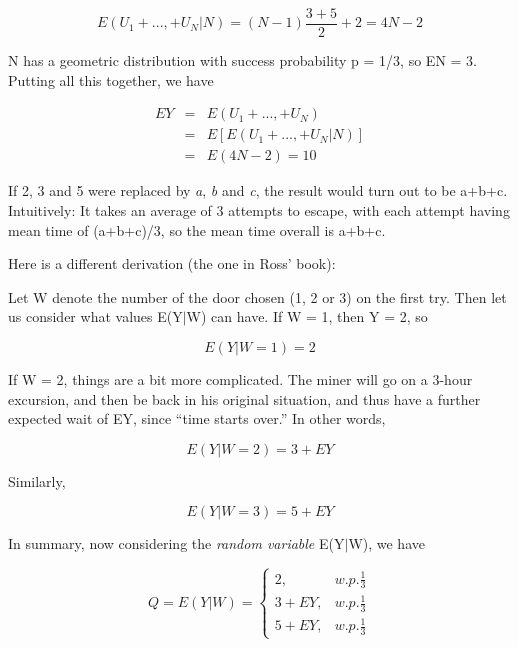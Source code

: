\begin{equation}
E(U_1+...,+U_N | N) = (N-1) \frac{3+5}{2} + 2 = 4N - 2
\end{equation}

N has a geometric distribution with success probability p = 1/3, so EN =
3.  Putting all this together, we have

\begin{eqnarray}
EY &=& E(U_1+...,+U_N) \\
&=& E\left [ E(U_1+...,+U_N | N) \right ] \\
&=& E(4N - 2) = 10
\end{eqnarray}

If 2, 3 and 5 were replaced by {\it a}, {\it b} and {\it c}, the result
would turn out to be a+b+c.  Intuitively:  It takes an average of 3
attempts to escape, with each attempt having mean time of (a+b+c)/3, so
the mean time overall is a+b+c.

Here is a different derivation (the one in Ross' book):

Let W denote the number of the door chosen (1, 2 or 3) on the first try.
Then let us consider what values E(Y$|$W) can have. If W = 1, then Y =
2, so

\begin{equation}
E(Y|W=1)=2
\end{equation}

If W = 2, things are a bit more complicated. The miner will go on a
3-hour excursion, and then be back in his original situation, and thus
have a further expected wait of EY, since ``time starts over.''  In
other words,

\begin{equation}
E(Y|W=2)=3+EY
\end{equation}


Similarly, 

\begin{equation}
E(Y|W=3)=5+EY
\end{equation}

In summary, now considering the \textit{random variable} E(Y$|$W), we have

\begin{equation}
Q=E(Y|W)=\left\{ \begin{array}{rl}
2, & w.p.\frac{1}{3}\\
3+EY, & w.p.\frac{1}{3}\\
5+EY, & w.p.\frac{1}{3}
\end{array}\right. 
\end{equation}

